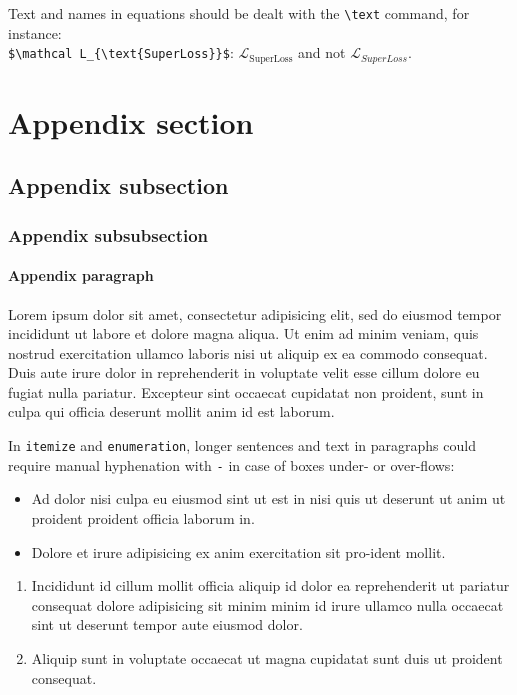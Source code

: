 \documentclass{melba}
\begin{document}
		Text and names in equations should be dealt with the \verb|\text| command, for instance:\\
		\verb|$\mathcal L_{\text{SuperLoss}}$|: $\mathcal L_{\text{SuperLoss}}$ and not $\mathcal L_{SuperLoss}$.

\section{Appendix section}
	\subsection{Appendix subsection}
		\subsubsection{Appendix subsubsection}
			\paragraph{Appendix paragraph} Lorem ipsum dolor sit amet, consectetur adipisicing elit, sed do eiusmod
			tempor incididunt ut labore et dolore magna aliqua. Ut enim ad minim veniam,
			quis nostrud exercitation ullamco laboris nisi ut aliquip ex ea commodo
			consequat. Duis aute irure dolor in reprehenderit in voluptate velit esse
			cillum dolore eu fugiat nulla pariatur. Excepteur sint occaecat cupidatat non
			proident, sunt in culpa qui officia deserunt mollit anim id est laborum.

			In \verb|itemize| and \verb|enumeration|, longer sentences and text in paragraphs could require manual hyphenation with \verb|-| in case of boxes under- or over-flows:
			\begin{itemize}
				\item Ad dolor nisi culpa eu eiusmod sint ut est in nisi quis ut deserunt ut anim ut proident proident officia laborum in.
				\item Dolore et irure adipisicing ex anim exercitation sit pro-ident mollit.
			\end{itemize}

			\begin{enumerate}
				\item Incididunt id cillum mollit officia aliquip id dolor ea reprehenderit ut pariatur consequat dolore adipisicing sit minim minim id irure ullamco nulla occaecat sint ut deserunt tempor aute eiusmod dolor.
				\item Aliquip sunt in voluptate occaecat ut magna cupidatat sunt duis ut proident consequat.
			\end{enumerate}
\end{document}
